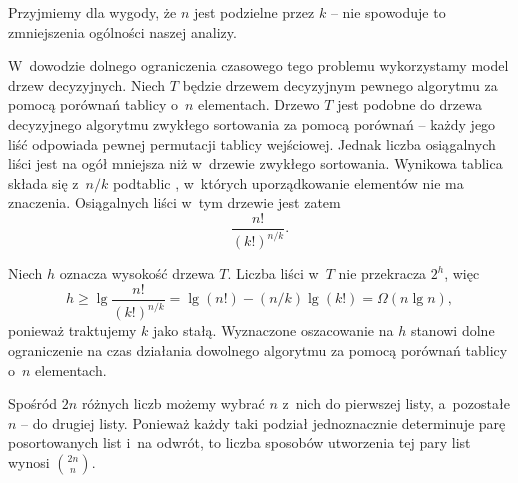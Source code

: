 \subproblem %
Przyjmiemy dla wygody, że $n$ jest podzielne przez $k$ -- nie spowoduje to zmniejszenia ogólności naszej analizy.


W~dowodzie dolnego ograniczenia czasowego tego problemu wykorzystamy model drzew decyzyjnych. Niech $T$ będzie drzewem decyzyjnym pewnego algorytmu  za pomocą porównań tablicy o~$n$ elementach. Drzewo $T$ jest podobne do drzewa decyzyjnego algorytmu zwykłego sortowania za pomocą porównań -- każdy jego liść odpowiada pewnej permutacji tablicy wejściowej. Jednak liczba osiągalnych liści jest na ogół mniejsza niż w~drzewie zwykłego sortowania. Wynikowa tablica składa się z~$n/k$ podtablic , w~których uporządkowanie elementów nie ma znaczenia. Osiągalnych liści w~tym drzewie jest zatem
\[
    \frac{n!}{(k!)^{n/k}}.
\]

Niech $h$ oznacza wysokość drzewa $T$. Liczba liści w~$T$ nie przekracza $2^h$, więc
\[
    h \ge \lg\frac{n!}{(k!)^{n/k}} = \lg(n!)-(n/k)\lg(k!) = \Omega(n\lg n),
\]
ponieważ traktujemy $k$ jako stałą. Wyznaczone oszacowanie na $h$ stanowi dolne ograniczenie na czas działania dowolnego algorytmu  za pomocą porównań tablicy o~$n$ elementach. 


\subproblem %
Spośród $2n$ różnych liczb możemy wybrać $n$ z~nich do pierwszej listy, a~pozostałe $n$ -- do drugiej listy. Ponieważ każdy taki podział jednoznacznie determinuje parę posortowanych list i~na odwrót, to liczba sposobów utworzenia tej pary list wynosi $\binom{2n}{n}$.


